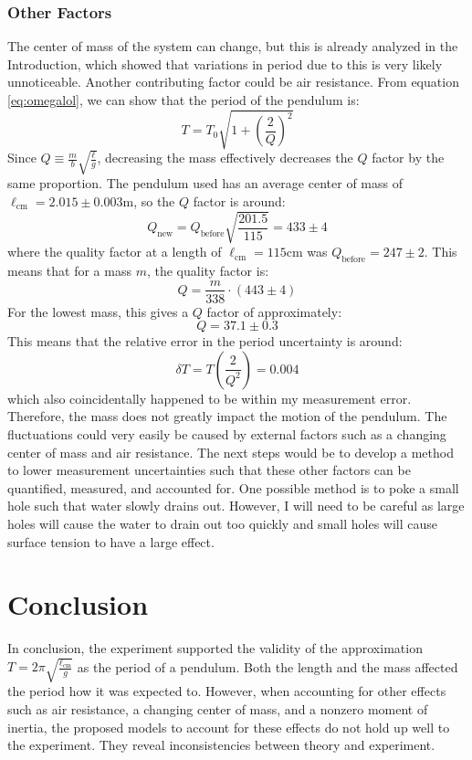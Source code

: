\documentclass[%
 reprint,
 amsmath,amssymb
 aps,
]{revtex4-2}
\begin{document}
\subsubsection{Other Factors}
The center of mass of the system can change, but this is already analyzed in the Introduction, which showed that variations in period due to this is very likely unnoticeable. Another contributing factor could be air resistance. From equation \ref{eq:omegalol}, we can show that the period of the pendulum is:
\begin{equation}
    T = T_0\sqrt{1+\left(\frac{2}{Q}\right)^2}
    \label{eq:}
\end{equation}
Since $Q \equiv \frac{m}{b}\sqrt{\frac{\ell}{g}}$, decreasing the mass effectively decreases the $Q$ factor by the same proportion. The pendulum used has an average center of mass of $\ell_\text{cm}=2.015 \pm 0.003 \si{\meter}$, so the $Q$ factor is around:
\begin{equation}
    Q_\text{new} = Q_\text{before}\sqrt{\frac{201.5}{115}} = 433 \pm 4
    \label{eq:}
\end{equation}
where the quality factor at a length of $\ell_\text{cm}=115\si{\centi\meter}$ was $Q_\text{before}=247 \pm 2$. This means that for a mass $m$, the quality factor is:
\begin{equation}
    Q = \frac{m}{338} \cdot \left(443 \pm 4\right)
    \label{eq:}
\end{equation}
For the lowest mass, this gives a $Q$ factor of approximately:
\begin{equation}
    Q = 37.1 \pm 0.3
    \label{eq:}
\end{equation}
This means that the relative error in the period uncertainty is around:
\begin{equation}
    \delta T = T\left(\frac{2}{Q^2}\right) = 0.004
    \label{eq:}
\end{equation}
which also coincidentally happened to be within my measurement error. Therefore, the mass does not greatly impact the motion of the pendulum. The fluctuations could very easily be caused by external factors such as a changing center of mass and air resistance. The next steps would be to develop a method to lower measurement uncertainties such that these other factors can be quantified, measured, and accounted for. One possible method is to poke a small hole such that water slowly drains out. However, I will need to be careful as large holes will cause the water to drain out too quickly and small holes will cause surface tension to have a large effect.
\section{Conclusion}
In conclusion, the experiment supported the validity of the approximation $T=2\pi\sqrt{\frac{\ell_\text{cm}}{g}}$ as the period of a pendulum. Both the length and the mass affected the period how it was expected to. However, when accounting for other effects such as air resistance, a changing center of mass, and a nonzero moment of inertia, the proposed models to account for these effects do not hold up well to the experiment. They reveal inconsistencies between theory and experiment.
\end{document}
